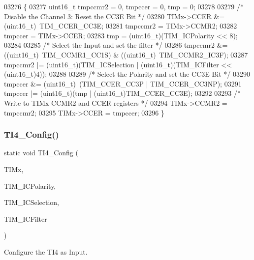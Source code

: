 \begin{DoxyCode}
03276 \{
03277   uint16\_t tmpccmr2 = 0, tmpccer = 0, tmp = 0;
03278 
03279   \textcolor{comment}{/* Disable the Channel 3: Reset the CC3E Bit */}
03280   TIMx->CCER &= (uint16\_t)~TIM_CCER_CC3E;
03281   tmpccmr2 = TIMx->CCMR2;
03282   tmpccer = TIMx->CCER;
03283   tmp = (uint16\_t)(TIM\_ICPolarity << 8);
03284 
03285   \textcolor{comment}{/* Select the Input and set the filter */}
03286   tmpccmr2 &= ((uint16\_t)~TIM_CCMR1_CC1S) & ((uint16\_t)~TIM_CCMR2_IC3F);
03287   tmpccmr2 |= (uint16\_t)(TIM\_ICSelection | (uint16\_t)(TIM\_ICFilter << (uint16\_t)4));
03288 
03289   \textcolor{comment}{/* Select the Polarity and set the CC3E Bit */}
03290   tmpccer &= (uint16\_t)~(TIM_CCER_CC3P | TIM_CCER_CC3NP);
03291   tmpccer |= (uint16\_t)(tmp | (uint16\_t)TIM_CCER_CC3E);
03292 
03293   \textcolor{comment}{/* Write to TIMx CCMR2 and CCER registers */}
03294   TIMx->CCMR2 = tmpccmr2;
03295   TIMx->CCER = tmpccer;
03296 \}
\end{DoxyCode}
\mbox{\label{group__TIM__Private__Functions_gaee26c0ada47174264fcd624cad3a91aa}} 
\subsubsection{T\+I4\+\_\+\+Config()}
{\footnotesize\ttfamily static void T\+I4\+\_\+\+Config (\begin{DoxyParamCaption}\item[{\textbf{ T\+I\+M\+\_\+\+Type\+Def} $\ast$}]{T\+I\+Mx,  }\item[{uint16\+\_\+t}]{T\+I\+M\+\_\+\+I\+C\+Polarity,  }\item[{uint16\+\_\+t}]{T\+I\+M\+\_\+\+I\+C\+Selection,  }\item[{uint16\+\_\+t}]{T\+I\+M\+\_\+\+I\+C\+Filter }\end{DoxyParamCaption})\hspace{0.3cm}{\ttfamily [static]}}



Configure the T\+I4 as Input. 


